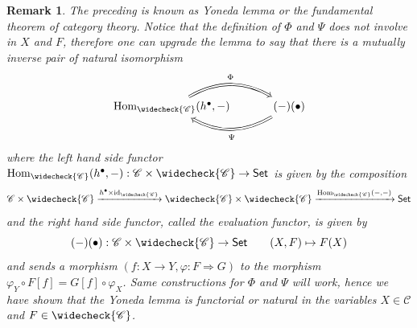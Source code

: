 \documentclass[10pt]{book}
\theoremstyle{bookplain}
\theoremstyle{bookdefinition}
\theoremstyle{bookremark}
\newtheorem{remark}[theorem]{Remark}
\begin{document}
\begin{remark}
    \label{rmk:yoneda}
    The preceding  is known as \textit{Yoneda lemma} or the \textit{fundamental theorem of category theory}. 
    Notice that the definition of $\Phi$ and $\Psi$ does not involve in $X$ and $F$, therefore one can upgrade the lemma to say that there is a mutually inverse pair of natural isomorphism 
    \[\begin{tikzcd}[column sep=3em] %
        {\mathrm{Hom}_{\widecheck{\mathscr{C}}}(h^{\bullet},-)}
        \arrow[Rightarrow, r, bend left=30, "\Phi"{yshift=2pt}]
        & {(-)(\bullet)}
        \arrow[Rightarrow, l, bend left=30, "\Psi"{yshift=-2pt}]
    \end{tikzcd}
    \]
    where the left hand side functor $\mathrm{Hom}_{\widecheck{\mathscr{C}}}(h^{\bullet},-):\mathscr{C}\times\widecheck{\mathscr{C}}\rightarrow\mathsf{Set}$ is given by the composition 
    \[\mathscr{C}\times \widecheck{\mathscr{C}}\xrightarrow{h^\bullet\times \mathrm{id}_{\widecheck{\mathscr{C}}}} \widecheck{\mathscr{C}}\times \widecheck{\mathscr{C}}\xrightarrow{\mathrm{Hom}_{\widecheck{\mathscr{C}}}(-,-)}\mathsf{Set}\]
    and the right hand side functor, called the \textit{evaluation functor}, is given by 
    \[(-)(\bullet):\mathscr{C}\times \widecheck{\mathscr{C}}\rightarrow\mathsf{Set}\qquad (X,F)\mapsto F(X) \]
    and sends a morphism $(f:X\rightarrow Y,\varphi:F\Rightarrow G)$ to the morphism $\varphi_Y\circ F[f]=G[f]\circ \varphi_X$. Same constructions for $\Phi$ and $\Psi$ will work, hence we have shown that the Yoneda lemma is \textit{functorial} or \textit{natural} in the variables $X\in\mathscr{C}$ and $F\in \widecheck{\mathscr{C}}$. 
\end{remark}
\end{document}

